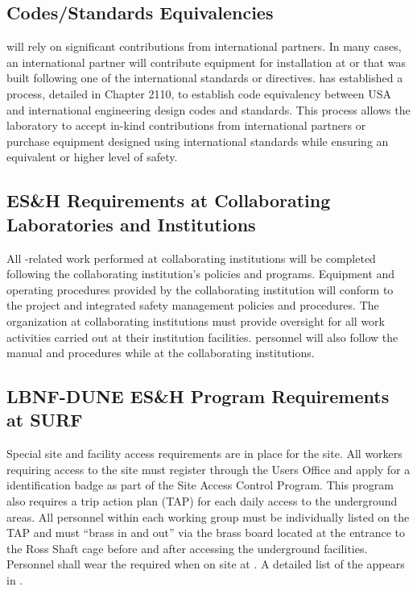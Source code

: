 \subsection{Codes/Standards Equivalencies}
\label{sec:es-tc-esh_codes}

 will rely on significant contributions from international
partners. In many cases, an international partner will contribute
equipment for installation at  or  
that was built following one of the
international standards or directives.  has established a
process, detailed in  Chapter 2110, to establish code
equivalency between USA and international engineering design codes
and standards. This process allows the laboratory to accept in-kind
contributions from international partners or purchase equipment
designed using international standards while ensuring an equivalent or
higher level of safety.


\subsection{ES\&H Requirements at Collaborating Laboratories and Institutions}

All -related work performed at collaborating institutions will be completed
following the collaborating institution's  policies and
programs. Equipment and operating procedures provided by the
collaborating institution will conform to the  project
 and integrated safety management policies and
procedures. The  organization at collaborating institutions
must provide  oversight for all work activities carried
out at their institution facilities. 
personnel will also follow the  manual and procedures while at
the collaborating institutions.

\subsection{LBNF-DUNE ES\&H Program Requirements at SURF}

Special site and facility access requirements are in place for the  site. All  workers requiring access to the  site must
register through the \fnal Users Office and apply for
a  identification badge as part of
the  Site Access Control Program.
This program also requires a trip action plan (TAP) for each daily access to the
underground areas.  All personnel within each working group must be
individually listed on the TAP and must ``brass in and
out'' via the brass board located at the entrance to the Ross Shaft
cage before and after accessing the underground facilities. Personnel shall wear the required  when on site at . 
A detailed list of the  appears in \tcchesh. 


